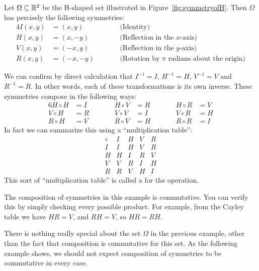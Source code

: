 \begin{example}\label{eg:symmetryofH}
  Let $\Omega \subseteq \mathbb{R}^{2}$ be the H-shaped set illustrated in
  Figure~\ref{fig:symmetryofH}.  Then $\Omega$ has percisely the following
  symmetries:
  \begin{alignat*}{4}
    I(x,y) &= (x,y) &\qquad& \text{(Identity)} \\
    H(x,y) &= (x,-y) && \text{(Reflection in the $x$-axis)} \\
    V(x,y) &= (-x,y) && \text{(Reflection in the $y$-axis)} \\
    R(x,y) &= (-x,-y) && \text{(Rotation by $\pi$ radians about the origin)}
  \end{alignat*}
  
  We can confirm by direct calculation that $I^{-1} = I$, $H^{-1} = H$, $V^{-1}
  = V$ and $R^{-1} = R$.  In other words, each of these transformations is its
  own inverse.  These symmetries compose in the following ways:
  \begin{alignat*}{6}
    H \circ H &= I & \qquad & H \circ V &= R & \qquad & H \circ R &= V\\
    V \circ H &= R && V \circ V &= I && V \circ R &= H\\
    R \circ H &= V && R \circ V &= H && R \circ R &= I
  \end{alignat*}
  In fact we can summarize this using a ``multiplication table'':
  \[
    \begin{array}{c|cccc}
      \circ & I & H & V & R \\
      \hline
          I & I & H & V & R \\
          H & H & I & R & V \\
          V & V & R & I & H \\
          R & R & V & H & I 
    \end{array}
  \]
  This sort of ``multiplication table'' is called a  for the operation.
  
  The composition of symmetries in this example is commutative.  You can verify
  this by simply checking every possible product.  For example, from the Cayley
  table we have $HR = V$, and $RH = V$, so $HR = RH$.
\end{example}

There is nothing really special about the set $\Omega$ in the previous
example, other than the fact that composition is commutative for this set.
As the following example shows, we should not expect composition of
symmetries to be commutative in every case.

